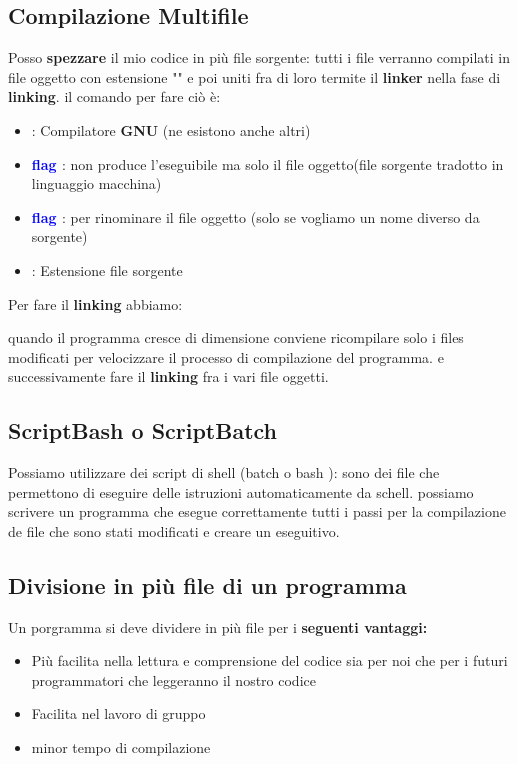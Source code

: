 \subsection{Compilazione Multifile}
Posso \textbf{spezzare} il mio codice in più file sorgente: tutti i file verranno compilati in file oggetto con estensione "" e poi uniti fra di loro termite il \textbf{linker} nella fase di \textbf{linking}.
\newline\newline il comando per fare ciò è: 

\begin{itemize}
    \item \textbf{\textcolor{blue}{}} : Compilatore \textbf{GNU} (ne esistono anche altri)
    \item \textbf{\textcolor{blue}{flag }} : non produce l'eseguibile ma solo il file oggetto(file sorgente tradotto in linguaggio macchina)
    \item \textbf{\textcolor{blue}{flag }} : per rinominare il file oggetto (solo se vogliamo un nome diverso da sorgente)
    
    \item \textbf{\textcolor{blue}{}} : Estensione file sorgente  \newline \newpage
\end{itemize}
 Per fare il \textbf{linking} abbiamo: 
 
quando il programma cresce di dimensione conviene ricompilare solo i files modificati per velocizzare il processo di compilazione del programma. e successivamente fare il \textbf{linking} fra i vari file oggetti. \newline

\subsection{ScriptBash o ScriptBatch}

Possiamo utilizzare dei script di shell (batch  o bash ): sono dei file che permettono di eseguire delle istruzioni automaticamente da schell. possiamo scrivere un programma che esegue correttamente tutti i passi per la compilazione de file che sono stati modificati  e creare un eseguitivo.\newline


\subsection{Divisione in più file di un programma}
Un porgramma si deve dividere in più file per i \textbf{seguenti vantaggi:}
\begin{itemize}
    \item Più facilita nella lettura e comprensione del codice sia per noi che per i futuri programmatori che leggeranno il nostro codice
    \item Facilita nel lavoro di gruppo
    \item minor tempo di compilazione 
\end{itemize}

